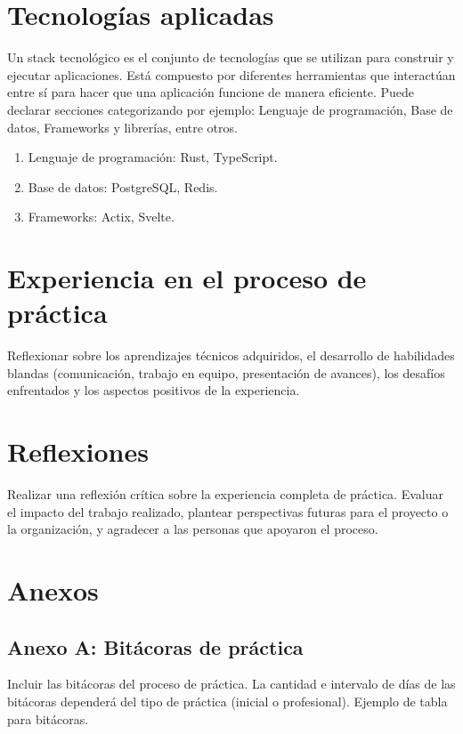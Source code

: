 \documentclass[12pt, a4paper]{article}
\begin{document}
\section{Tecnologías aplicadas}
Un stack tecnológico es el conjunto de tecnologías que se utilizan para construir y ejecutar aplicaciones. Está compuesto por diferentes herramientas que interactúan entre sí para hacer que una aplicación funcione de manera eficiente. Puede declarar secciones categorizando por ejemplo: Lenguaje de programación, Base de datos, Frameworks y librerías, entre otros.

\begin{enumerate}
    \item Lenguaje de programación: Rust, TypeScript.
    \item Base de datos: PostgreSQL, Redis.
    \item Frameworks: Actix, Svelte.
\end{enumerate}

\section{Experiencia en el proceso de práctica}
Reflexionar sobre los aprendizajes técnicos adquiridos, el desarrollo de habilidades blandas (comunicación, trabajo en equipo, presentación de avances), los desafíos enfrentados y los aspectos positivos de la experiencia.

\section{Reflexiones}
Realizar una reflexión crítica sobre la experiencia completa de práctica. Evaluar el impacto del trabajo realizado, plantear perspectivas futuras para el proyecto o la organización, y agradecer a las personas que apoyaron el proceso.

\newpage
\printbibliography[title={Referencias}]

\newpage
\section*{Anexos}

\subsection*{Anexo A: Bitácoras de práctica}
Incluir las bitácoras del proceso de práctica. La cantidad e intervalo de días de las bitácoras dependerá del tipo de práctica (inicial o profesional). Ejemplo de tabla para bitácoras.
\end{document}
